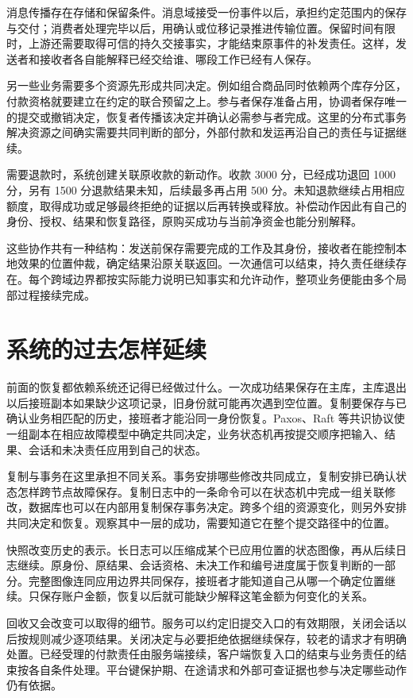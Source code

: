 消息传播存在存储和保留条件。消息域接受一份事件以后，承担约定范围内的保存与交付；消费者处理完毕以后，用确认或位移记录推进传输位置。保留时间有限时，上游还需要取得可信的持久交接事实，才能结束原事件的补发责任。这样，发送者和接收者各自能解释已经交给谁、哪段工作已经有人保存。

另一些业务需要多个资源先形成共同决定。例如组合商品同时依赖两个库存分区，付款资格就要建立在约定的联合预留之上。参与者保存准备占用，协调者保存唯一的提交或撤销决定，恢复者传播该决定并确认必需参与者完成。这里的分布式事务解决资源之间确实需要共同判断的部分，外部付款和发运再沿自己的责任与证据继续。

需要退款时，系统创建关联原收款的新动作。收款 3000 分，已经成功退回 1000 分，另有 1500 分退款结果未知，后续最多再占用 500 分。未知退款继续占用相应额度，取得成功或足够最终拒绝的证据以后再转换或释放。补偿动作因此有自己的身份、授权、结果和恢复路径，原购买成功与当前净资金也能分别解释。

这些协作共有一种结构：发送前保存需要完成的工作及其身份，接收者在能控制本地效果的位置仲裁，确定结果沿原关联返回。一次通信可以结束，持久责任继续存在。每个跨域边界都按实际能力说明已知事实和允许动作，整项业务便能由多个局部过程接续完成。

\section*{系统的过去怎样延续}

前面的恢复都依赖系统还记得已经做过什么。一次成功结果保存在主库，主库退出以后接班副本如果缺少这项记录，旧身份就可能再次遇到空位置。复制要保存与已确认业务相匹配的历史，接班者才能沿同一身份恢复。Paxos、Raft 等共识协议使一组副本在相应故障模型中确定共同决定，业务状态机再按提交顺序把输入、结果、会话和未决责任应用到自己的状态。

复制与事务在这里承担不同关系。事务安排哪些修改共同成立，复制安排已确认状态怎样跨节点故障保存。复制日志中的一条命令可以在状态机中完成一组关联修改，数据库也可以在内部用复制保存事务决定。跨多个组的资源变化，则另外安排共同决定和恢复。观察其中一层的成功，需要知道它在整个提交路径中的位置。

快照改变历史的表示。长日志可以压缩成某个已应用位置的状态图像，再从后续日志继续。原身份、原结果、会话资格、未决工作和编号进度属于恢复判断的一部分。完整图像连同应用边界共同保存，接班者才能知道自己从哪一个确定位置继续。只保存账户金额，恢复以后就可能缺少解释这笔金额为何变化的关系。

回收又会改变可以取得的细节。服务可以约定旧提交入口的有效期限，关闭会话以后按规则减少逐项结果。关闭决定与必要拒绝依据继续保存，较老的请求才有明确处置。已经受理的付款责任由服务端接续，客户端恢复入口的结束与业务责任的结束按各自条件处理。平台键保护期、在途请求和外部可查证据也参与决定哪些动作仍有依据。

